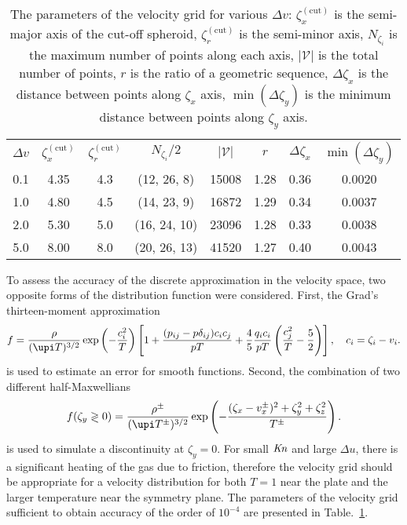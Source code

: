 \documentclass[final]{jfm} %
\newcommand{\Kn}{\mbox{\textit{Kn}}}
\begin{document}
\begin{table}
    \centering
    \begin{tabular}{cccccccc}
        \(\Delta{v}\) & \(\zeta^{(\mathrm{cut})}_x\) & \(\zeta^{(\mathrm{cut})}_r\)
            & \(N_{\zeta_i}/2\) & \(|\mathcal{V}|\) & \(r\) & \(\Delta\zeta_x\) & \(\min(\Delta\zeta_y)\) \\[3pt]
        0.1 & 4.35 & 4.3 & (12, 26, 8)  & 15008 & 1.28 & 0.36 & 0.0020 \\
        1.0 & 4.80 & 4.5 & (14, 23, 9)  & 16872 & 1.29 & 0.34 & 0.0037 \\
        2.0 & 5.30 & 5.0 & (16, 24, 10) & 23096 & 1.28 & 0.33 & 0.0038 \\
        5.0 & 8.00 & 8.0 & (20, 26, 13) & 41520 & 1.27 & 0.40 & 0.0043 \\
    \end{tabular}
    \caption{The parameters of the velocity grid for various \(\Delta{v}\):
        \(\zeta^{(\mathrm{cut})}_x\) is the semi-major axis of the cut-off spheroid,
        \(\zeta^{(\mathrm{cut})}_r\) is the semi-minor axis,
        \(N_{\zeta_i}\) is the maximum number of points along each axis,
        \(|\mathcal{V}|\) is the total number of points,
        \(r\) is the ratio of a geometric sequence,
        \(\Delta\zeta_x\) is the distance between points along \(\zeta_x\) axis,
        \(\min(\Delta\zeta_y)\) is the minimum distance between points along \(\zeta_y\) axis.}
    \label{table:velocity_grid}
\end{table}

To assess the accuracy of the discrete approximation in the velocity space,
two opposite forms of the distribution function were considered.
First, the Grad's thirteen-moment approximation
\begin{equation}\label{eq:grad13}
    f = \frac{\rho}{(\upi T)^{3/2}}\exp\left(-\frac{c_i^2}{ T}\right)
    \left[ 1 + \frac{(p_{ij}-p\delta_{ij})c_ic_j}{pT} + \frac4{5}\frac{q_ic_i}{pT}\left(\frac{c_j^2}{T}-\frac5{2}\right) \right],
    \quad c_i = \zeta_i - v_i.
\end{equation}
is used to estimate an error for smooth functions.
Second, the combination of two different half-Maxwellians
\begin{equation}\label{eq:double_Maxwell}
    f(\zeta_y\gtrless0) = \frac{\rho^\pm}{(\upi T^\pm)^{3/2}}\exp\left(-\frac{(\zeta_x-v_x^\pm)^2+\zeta_y^2+\zeta_z^2}{T^\pm}\right).
\end{equation}
is used to simulate a discontinuity at \(\zeta_y=0\).
For small \(\Kn\) and large \(\Delta{u}\), there is a significant heating of the gas due to friction,
therefore the velocity grid should be appropriate for a velocity distribution
for both \(T=1\) near the plate and the larger temperature near the symmetry plane.
The parameters of the velocity grid sufficient to obtain accuracy of the order of \(10^{-4}\)
are presented in Table.~\ref{table:velocity_grid}.
\end{document}
